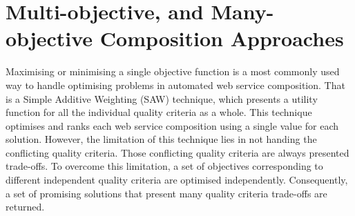 
\section{Multi-objective, and Many-objective Composition Approaches}\label{MultiObjective}


Maximising or minimising a single objective function is a most commonly used way to handle optimising problems in automated web service composition.  That is a Simple Additive Weighting (SAW) \cite{hwang1981lecture} technique, which presents a utility function for all the individual quality criteria as a whole. This technique optimises and ranks each web service composition using a single value for each solution. However,  the limitation of this technique lies in not handing the conflicting quality criteria.  Those conflicting quality criteria are always presented trade-offs. To overcome this limitation, a set of objectives corresponding to different independent quality criteria are optimised independently. Consequently,  a set of promising solutions that present many quality criteria trade-offs are returned.


